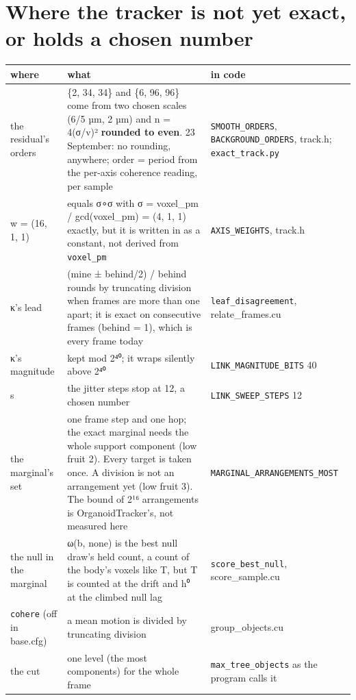 \section{\texorpdfstring{Where the tracker is not yet exact, or holds a chosen number}{Where the tracker is not yet exact, or holds a chosen number}}

{\small
\setlength{\tabcolsep}{6pt}
\begin{longtable}{>{\RaggedRight\arraybackslash}p{}>{\RaggedRight\arraybackslash}p{}>{\RaggedRight\arraybackslash}p{}}
\toprule
where & what & in code \\
\midrule
\endhead
the residual's orders & \{2, 34, 34\} and \{6, 96, 96\} come from two chosen scales (6/5 µm, 2 µm) and n = 4(σ/v)² \textbf{rounded to even}. 23 September: no rounding, anywhere; order = period from the per-axis coherence reading, per sample & \texttt{SMOOTH\_\allowbreak{}ORDERS}, \texttt{BACKGROUND\_\allowbreak{}ORDERS}, track.h; \texttt{exact\_\allowbreak{}track.\allowbreak{}py} \\
w = (16, 1, 1) & equals σ∘σ with σ = voxel\_\allowbreak{}pm / gcd(voxel\_\allowbreak{}pm) = (4, 1, 1) exactly, but it is written in as a constant, not derived from \texttt{voxel\_\allowbreak{}pm} & \texttt{AXIS\_\allowbreak{}WEIGHTS}, track.h \\
κ's lead & (mine ± behind/2) / behind rounds by truncating division when frames are more than one apart; it is exact on consecutive frames (behind = 1), which is every frame today & \texttt{leaf\_\allowbreak{}disagreement}, relate\_\allowbreak{}frames.cu \\
κ's magnitude & kept mod 2⁴⁰; it wraps silently above 2⁴⁰ & \texttt{LINK\_\allowbreak{}MAGNITUDE\_\allowbreak{}BITS} 40 \\
s & the jitter steps stop at 12, a chosen number & \texttt{LINK\_\allowbreak{}SWEEP\_\allowbreak{}STEPS} 12 \\
the marginal's set & one frame step and one hop; the exact marginal needs the whole support component (low fruit 2). Every target is taken once. A division is not an arrangement yet (low fruit 3). The bound of 2¹⁶ arrangements is OrganoidTracker's, not measured here & \texttt{MARGINAL\_\allowbreak{}ARRANGEMENTS\_\allowbreak{}MOST} \\
the null in the marginal & ω(b, none) is the best null draw's held count, a count of the body's voxels like T, but T is counted at the drift and h⁰ at the climbed null lag & \texttt{score\_\allowbreak{}best\_\allowbreak{}null}, score\_\allowbreak{}sample.cu \\
\texttt{cohere} (off in base.cfg) & a mean motion is divided by truncating division & group\_\allowbreak{}objects.cu \\
the cut & one level (the most components) for the whole frame & \texttt{max\_\allowbreak{}tree\_\allowbreak{}objects} as the program calls it \\
\bottomrule
\end{longtable}
}

